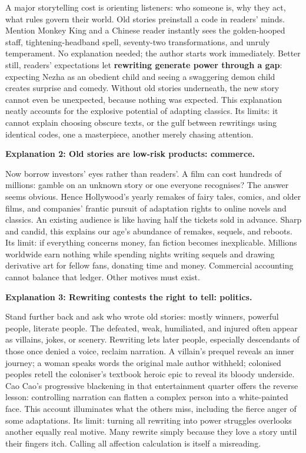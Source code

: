 A major storytelling cost is orienting listeners: who someone is, why they act, what rules govern their world. Old stories preinstall a code in readers' minds. Mention Monkey King and a Chinese reader instantly sees the golden-hooped staff, tightening-headband spell, seventy-two transformations, and unruly temperament. No explanation needed; the author starts work immediately. Better still, readers' expectations let \textbf{rewriting generate power through a gap}: expecting Nezha as an obedient child and seeing a swaggering demon child creates surprise and comedy. Without old stories underneath, the new story cannot even be unexpected, because nothing was expected. This explanation neatly accounts for the explosive potential of adapting classics. Its limits: it cannot explain choosing obscure texts, or the gulf between rewritings using identical codes, one a masterpiece, another merely chasing attention.

\textbf{Explanation 2: Old stories are low-risk products: commerce.}

Now borrow investors' eyes rather than readers'. A film can cost hundreds of millions: gamble on an unknown story or one everyone recognises? The answer seems obvious. Hence Hollywood's yearly remakes of fairy tales, comics, and older films, and companies' frantic pursuit of adaptation rights to online novels and classics. An existing audience is like having half the tickets sold in advance. Sharp and candid, this explains our age's abundance of remakes, sequels, and reboots. Its limit: if everything concerns money, fan fiction becomes inexplicable. Millions worldwide earn nothing while spending nights writing sequels and drawing derivative art for fellow fans, donating time and money. Commercial accounting cannot balance that ledger. Other motives must exist.

\textbf{Explanation 3: Rewriting contests the right to tell: politics.}

Stand further back and ask who wrote old stories: mostly winners, powerful people, literate people. The defeated, weak, humiliated, and injured often appear as villains, jokes, or scenery. Rewriting lets later people, especially descendants of those once denied a voice, reclaim narration. A villain's prequel reveals an inner journey; a woman speaks words the original male author withheld; colonised peoples retell the coloniser's textbook heroic epic to reveal its bloody underside. Cao Cao's progressive blackening in that entertainment quarter offers the reverse lesson: controlling narration can flatten a complex person into a white-painted face. This account illuminates what the others miss, including the fierce anger of some adaptations. Its limit: turning all rewriting into power struggles overlooks another equally real motive. Many rewrite simply because they love a story until their fingers itch. Calling all affection calculation is itself a misreading.

